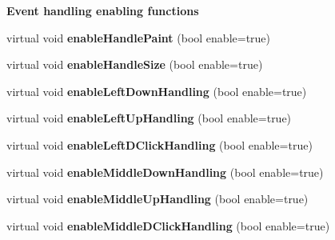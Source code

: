 \begin{Indent}{\bf Event handling enabling functions}\par
\begin{DoxyCompactItemize}
\item 
virtual void {\bfseries enable\+Handle\+Paint} (bool enable=true)\hypertarget{class_view_1_1_robot_world_canvas_ac74704c6f3337c017a338aa60ac550a6}{}\label{class_view_1_1_robot_world_canvas_ac74704c6f3337c017a338aa60ac550a6}

\item 
virtual void {\bfseries enable\+Handle\+Size} (bool enable=true)\hypertarget{class_view_1_1_robot_world_canvas_a9a85f803ceea25f82b6dab3a68b51915}{}\label{class_view_1_1_robot_world_canvas_a9a85f803ceea25f82b6dab3a68b51915}

\item 
virtual void {\bfseries enable\+Left\+Down\+Handling} (bool enable=true)\hypertarget{class_view_1_1_robot_world_canvas_aff53f317176e354f858710ad334473b1}{}\label{class_view_1_1_robot_world_canvas_aff53f317176e354f858710ad334473b1}

\item 
virtual void {\bfseries enable\+Left\+Up\+Handling} (bool enable=true)\hypertarget{class_view_1_1_robot_world_canvas_adae323b06595ebe6c203beedd1f88594}{}\label{class_view_1_1_robot_world_canvas_adae323b06595ebe6c203beedd1f88594}

\item 
virtual void {\bfseries enable\+Left\+D\+Click\+Handling} (bool enable=true)\hypertarget{class_view_1_1_robot_world_canvas_ad34bec03c60bc74967da0815bfc3decb}{}\label{class_view_1_1_robot_world_canvas_ad34bec03c60bc74967da0815bfc3decb}

\item 
virtual void {\bfseries enable\+Middle\+Down\+Handling} (bool enable=true)\hypertarget{class_view_1_1_robot_world_canvas_a2cf15bd7f032378476292e4ef4baeb60}{}\label{class_view_1_1_robot_world_canvas_a2cf15bd7f032378476292e4ef4baeb60}

\item 
virtual void {\bfseries enable\+Middle\+Up\+Handling} (bool enable=true)\hypertarget{class_view_1_1_robot_world_canvas_aff0f17e087d0c16b61fc3fa4664d9280}{}\label{class_view_1_1_robot_world_canvas_aff0f17e087d0c16b61fc3fa4664d9280}

\item 
virtual void {\bfseries enable\+Middle\+D\+Click\+Handling} (bool enable=true)\hypertarget{class_view_1_1_robot_world_canvas_abbf14eaa663020a5c28ddc34b04a7d93}{}\label{class_view_1_1_robot_world_canvas_abbf14eaa663020a5c28ddc34b04a7d93}


\end{DoxyCompactItemize}
\end{Indent}
